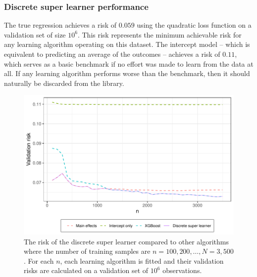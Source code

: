 \documentclass[./main.tex]{subfiles}
\begin{document}
\subsubsection{Discrete super learner performance}
The true regression achieves a risk of $ 0.059 $ using the quadratic loss function on a validation set of size $ 10^{6} $. This risk represents the minimum achievable risk for any learning algorithm operating on this dataset. The intercept model -- which is equivalent to predicting an average of the outcomes -- achieves a risk of $ 0.11 $, which serves as a basic benchmark if no effort was made to learn from the data at all. If any learning algorithm performs worse than the benchmark, then it should naturally be discarded from the library.  
\begin{figure}[H]
    \centering
    \includegraphics[width=\textwidth]{figures/losses_s22.pdf}
    \caption{The risk of the discrete super learner compared to other algorithms where the number of training samples are $n = 100, 200, \dots , N = 3,500 $. For each $ n $, each learning algorithm is fitted and their validation risks are calculated on a validation set of $ 10^{6} $ observations.} 
    \label{fig:loss_min_of_both}
\end{figure}
\end{document}
